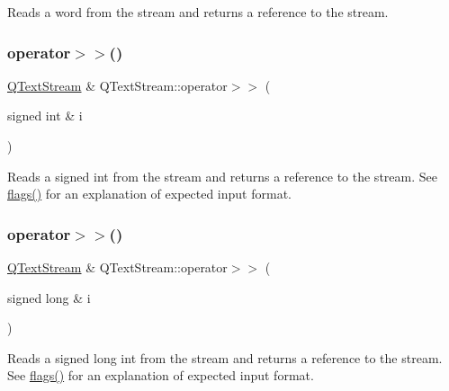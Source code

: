 Reads a word from the stream and returns a reference to the stream. \mbox{\label{class_q_text_stream_a220a232b218047c458f9e0a445b76831}} 
\subsubsection{\texorpdfstring{operator$>$$>$()}{operator>>()}\hspace{0.1cm}{\footnotesize\ttfamily [8/13]}}
{\footnotesize\ttfamily \mbox{\hyperlink{class_q_text_stream}{Q\+Text\+Stream}} \& Q\+Text\+Stream\+::operator$>$$>$ (\begin{DoxyParamCaption}\item[{signed int \&}]{i }\end{DoxyParamCaption})}

Reads a signed {\ttfamily int} from the stream and returns a reference to the stream. See \mbox{\hyperlink{class_q_text_stream_ab6cf395446ba04973dff067ab8b36978}{flags()}} for an explanation of expected input format. \mbox{\label{class_q_text_stream_aecfdad0a90cd7b4093b08a9d032d8563}} 
\subsubsection{\texorpdfstring{operator$>$$>$()}{operator>>()}\hspace{0.1cm}{\footnotesize\ttfamily [9/13]}}
{\footnotesize\ttfamily \mbox{\hyperlink{class_q_text_stream}{Q\+Text\+Stream}} \& Q\+Text\+Stream\+::operator$>$$>$ (\begin{DoxyParamCaption}\item[{signed long \&}]{i }\end{DoxyParamCaption})}

Reads a signed {\ttfamily long} int from the stream and returns a reference to the stream. See \mbox{\hyperlink{class_q_text_stream_ab6cf395446ba04973dff067ab8b36978}{flags()}} for an explanation of expected input format. \mbox{\label{class_q_text_stream_a075cf521ee2f67e28c246cba2aa50102}} 
